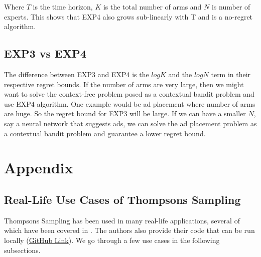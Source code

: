 \documentclass[11pt]{article}
\begin{document}
Where $T$ is the time horizon, $K$ is the total number of arms and $N$ is number of experts. This shows that EXP4 also grows sub-linearly with T and is a no-regret algorithm. 

\subsection{EXP3 vs EXP4}
\label{sec:differr}

The difference between EXP3 and EXP4 is the $logK$ and the $logN$ term in their respective regret bounds. If the number of arms are very large, then we might want to solve the context-free problem posed as a contextual bandit problem and use EXP4 algorithm. 
One example would be ad placement where number of arms are huge. So the regret bound for EXP3 will be large. If we can have a smaller $N$, say a neural network that suggests ads, we can solve the ad placement problem as a contextual bandit problem and guarantee a lower regret bound.






{


}




\newpage
\section{Appendix}
\subsection{Real-Life Use Cases of Thompsons Sampling}
Thompsons Sampling has been used in many real-life applications, several of which have been covered in \cite{russo2018tutorial}. The authors also provide their code that can be run locally (\href{https://github.com/iosband/ts_tutorial}{GitHub Link}). We go through a few use cases in the following subsections.
\end{document}
